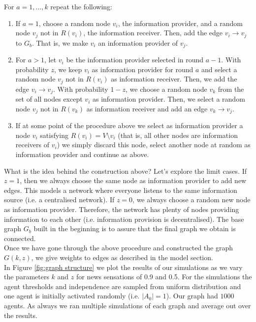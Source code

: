 \documentclass[10pt]{article}
\begin{document}
For $a = 1, \ldots, k$ repeat the following:
\begin{enumerate}
\item If $a = 1$, choose a random node $v_i$, the information provider, and a random node $v_j$ not in $R(v_i)$, the information receiver. Then, add the edge $v_i \rightarrow v_j$ to $G_b$. That is, we make $v_i$ an information provider of $v_j$.
\item For $a > 1$, let $v_i$ be the information provider selected in round $a-1$. With probability $z$, we keep $v_i$ as information provider for round $a$ and select a random node $v_j$ not in $R(v_i)$ as information receiver. Then, we add the edge $v_i \rightarrow v_j$. With probability $1-z$, we choose a random node $v_k$ from the set of all nodes except $v_i$ as information provider. Then, we select a random node $v_j$ not in $R(v_k)$ as information receiver and add an edge $v_k \rightarrow v_j$.
\item If at some point of the procedure above we select as information provider a node $v_i$ satisfying $R(v_i) = V\setminus {v_i}$ (that is, all other nodes are information receivers of $v_i$) we simply discard this node, select another node at random as information provider and continue as above.
\end{enumerate}


What is the idea behind the construction above? Let's explore the limit cases. If $z = 1$, then we always choose the same node as information provider to add new edges. This models a network where everyone listens to the same information source (i.e. a centralised network). If $z = 0$, we always choose a random new node as information provider. Therefore, the network has plenty of nodes providing information to each other (i.e. information provision is decentralised). The base graph $G_b$ built in the beginning is to assure that the final graph we obtain is connected.  \\

Once we have gone through the above procedure and constructed the graph $G(k,z)$, we give weights to edges as described in the model section.\\

In Figure \ref{fig:graph structure} we plot the results of our simulations as we vary the parameters $k$ and $z$ for news sensations of 0.9 and 0.5.
For the simulations the agent thresholds and independence are sampled from uniform distribution and one agent is initially activated randomly (i.e. $|A_0| = 1$). Our graph had $1000$ agents. As always we ran multiple simulations of each graph and average out over the results.\\
\end{document}
